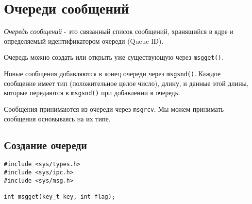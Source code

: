\section{Очереди сообщений}

\emph{Очередь сообщений} - это связанный список сообщений, хранящийся в ядре и определяемый идентификатором очереди (Queue ID).

Очередь можно создать или открыть уже существующую через \verb+msgget()+.

Новые сообщения добавляются в конец очереди через \verb+msgsnd()+. Каждое сообщение имеет тип (положительное целое число), длину, и данные этой длины, которые передаются в \verb+msgsnd()+ при добавлении в очередь.

Сообщения принимаются из очереди через \verb+msgrcv+. Мы можем принимать сообщения основываясь на их типе.

\subsection{Создание очереди}
\begin{verbatim}
#include <sys/types.h>
#include <sys/ipc.h>
#include <sys/msg.h>

int msgget(key_t key, int flag);
\end{verbatim}
